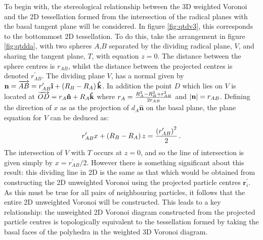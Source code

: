 To begin with, the stereological relationship between the 3D weighted Voronoi and the 2D tessellation formed from the intersection of the radical planes with the basal tangent plane will be considered.
In figure \ref{fig:qtdv3}, this corresponds to the bottommost 2D tessellation.
To do this, take the arrangement in figure \ref{fig:qtdda}, with two spheres $A$,$B$ separated by the dividing radical plane, $V$, and sharing the tangent plane, $T$, with equation $z=0$.
The distance between the sphere centres is $r_{AB}$, whilst the distance between the projected centres is denoted $r_{AB}^\prime$.
The dividing plane $V$, has a normal given by $\mathbf{n} =\overrightarrow{AB}=r_{AB}^\prime\boldsymbol{\hat{\textbf{\i}}}+\left(\rs_B-\rs_A\right)\mathbf{\hat{k}}$.
In addition the point $D$ which lies on $V$ is located at $\overrightarrow{OD}=r_{A}\mathbf{\hat{n}}+R_A\mathbf{\hat{k}}$ where $r_{A}=\frac{R_A^2-R_B^2+r_{AB}^2}{2r_{AB}}$ and $\lvert\mathbf{n}\rvert=r_{AB}$.
Defining the direction of $x$ as as the projection of $d_A\mathbf{\hat{n}}$ on the basal plane, the plane equation for $V$ can be deduced as:
\begin{equation}
	\label{eq:plane}
	r_{AB}^\prime x+\left(R_B-R_A\right)z=\frac{\left(r_{AB}^\prime\right)^2}{2}\,.
\end{equation}
The intersection of $V$ with $T$ occurs at $z=0$, and so the line of intersection is given simply by $x=r_{AB}^\prime/2$.
However there is something significant about this result: this dividing line in 2D is the same as that which would be obtained from constructing the 2D unweighted Voronoi using the projected particle centres $\mathbf{r}^\prime_i$.
As this must be true for all pairs of neighbouring particles, it follows that the entire 2D unweighted Voronoi will be constructed. 
This leads to a key relationship: the unweighted 2D Voronoi diagram constructed from the projected particle centres is topologically equivalent to the tessellation formed by taking the basal faces of the polyhedra in the weighted 3D Voronoi diagram.

